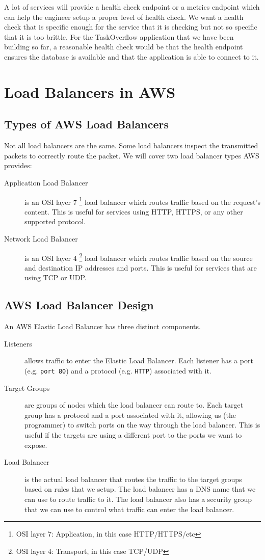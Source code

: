 \documentclass{csse4400}
\begin{document}
A lot of services will provide a health check endpoint or a metrics endpoint which can help the engineer setup a proper level of health check.
We want a health check that is specific enough for the service that it is checking but not so specific that it is too brittle.
For the TaskOverflow application that we have been building so far,
a reasonable health check would be that the health endpoint ensures the database is available and that the application is able to connect to it.

\section{Load Balancers in AWS}

\subsection{Types of AWS Load Balancers}
Not all load balancers are the same.
Some load balancers inspect the transmitted packets to correctly route the packet.
We will cover two load balancer types AWS provides:

\begin{description}
  \item[Application Load Balancer] is an OSI layer 7%
\footnote{OSI layer 7: Application, in this case HTTP/HTTPS/etc}
load balancer which routes traffic based on the request's content.
      This is useful for services using HTTP, HTTPS, or any other supported protocol.
  \item[Network Load Balancer] is an OSI layer 4%
\footnote{OSI layer 4: Transport, in this case TCP/UDP}
load balancer which routes traffic based on the source and destination IP addresses and ports.
This is useful for services that are using TCP or UDP.
\end{description}

\subsection{AWS Load Balancer Design}

An AWS Elastic Load Balancer has three distinct components. 

\begin{description}
  \item[Listeners] allows traffic to enter the Elastic Load Balancer.
  Each listener has a port (e.g. \texttt{port 80}) and a protocol (e.g. \texttt{HTTP}) associated with it.
  \item[Target Groups] are groups of nodes which the load balancer can route to. 
      Each target group has a protocol and a port associated with it, allowing us (the programmer) to switch ports on the way through the load balancer.
      This is useful if the targets are using a different port to the ports we want to expose.
  \item[Load Balancer] is the actual load balancer that routes the traffic to the target groups based on rules that we setup.
      The load balancer has a DNS name that we can use to route traffic to it.
      The load balancer also has a security group that we can use to control what traffic can enter the load balancer. 
\end{description}
\end{document}
